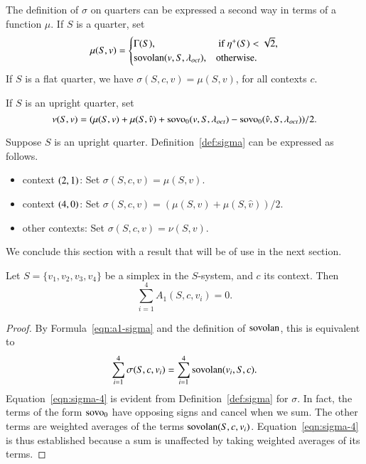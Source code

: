 The definition of $\sigma$ on quarters can be expressed a second
way in terms of a function $\mu$.  If $S$ is a quarter, set
    \begin{equation}
    \mu(S,v)=\begin{cases}
    \Gamma(S),&  \text{ if }\eta^+(S)<\sqrt2,\\
    {\operatorname{sovolan}}(v,S,\lambda_{oct}),& \hbox{otherwise.}\end{cases}
    \label{eqn:3.8}
    \end{equation}
If $S$ is a flat quarter, we have $\sigma(S,c,v)=\mu(S,v)$, for
all contexts $c$.

\begin{definition} If $S$ is an upright quarter, set
$$\nu(S,v)=(\mu(S,v)+\mu(S,\hat v) + 
  {\operatorname{sovo}}_0(v,S,\lambda_{oct})-{\operatorname{sovo}}_0(\hat v,S,\lambda_{oct}))/2.$$
\end{definition}


Suppose $S$ is an upright quarter.
Definition~\ref{def:sigma} can be expressed as follows.


\begin{itemize}
 \item context $\relax(2,1)$:  Set $\sigma(S,c,v)=\mu(S,v)$.
 \item context
    $\relax(4,0)$:  Set $\sigma(S,c,v)=(\mu(S,v)+\mu(S,\hat v))/2$.
 \item other contexts:
 Set $\sigma(S,c,v)=\nu(S,v)$.
\end{itemize}





We conclude this section with a result that will be of use in the
next section.

\begin{lemma}\label{lemma:A1-cancel}
Let $S=\{v_1,v_2,v_3,v_4\}$ be a simplex in the $S$-system,  and $c$
its context.   Then
   $$\sum_{i=1}^4 A_1(S,c,v_i)=0.$$
\end{lemma}

\begin{proof}
   By Formula~\ref{eqn:a1-sigma} and the definition of ${\operatorname{sovolan}}$,
this is equivalent to
      \begin{equation}
      \sum_{i=1}^4 \sigma(S,c,v_i) = \sum_{i=1}^4
      \op{sovolan}(v_i,S,c).  %
      \label{eqn:sigma-4}
      \end{equation}
Equation~\ref{eqn:sigma-4} is evident from
Definition~\ref{def:sigma} for $\sigma$.  In fact, the terms of the
form ${\operatorname{sovo}}_0$ have opposing signs and cancel when we sum. The other
terms are weighted averages of the terms ${\operatorname{sovolan}}(S,c,v_i)$. %
Equation~\ref{eqn:sigma-4} is thus established because a sum is
unaffected by taking weighted averages of its terms.
\end{proof}


